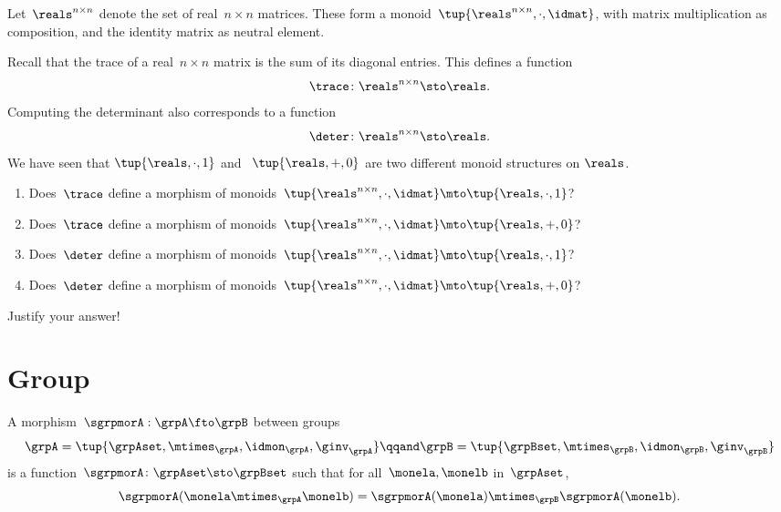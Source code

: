 \begin{gradedexercise}
  \label{ex:tr-and-det}
Let~$\reals^{n \times n}$ denote the set of real~$n \times n$ matrices. These form a monoid~$\tup{\reals^{n \times n}, \cdot, \idmat}$, with matrix multiplication as composition, and the identity matrix as neutral element.

Recall that the trace of a real~$n \times n$ matrix is the sum of its diagonal entries. This defines a function
\begin{equation}
\trace \colon \reals^{n \times n} \sto \reals.
\end{equation}
Computing the determinant also corresponds to a function
\begin{equation}
\deter \colon \reals^{n \times n} \sto \reals.
\end{equation}
We have seen that $\tup{ \reals, \cdot, 1}$ and ~$\tup{ \reals, +, 0}$ are two different monoid structures on $\reals$.
\begin{enumerate}
\item Does~$\trace$ define a morphism of monoids~$\tup{\reals^{n \times n}, \cdot, \idmat} \mto \tup{ \reals, \cdot, 1}$?
\item Does~$\trace$ define a morphism of monoids~$\tup{\reals^{n \times n}, \cdot, \idmat} \mto \tup{ \reals, + , 0}$?
\item Does~$\deter$ define a morphism of monoids~$\tup{\reals^{n \times n}, \cdot, \idmat} \mto \tup{ \reals, \cdot, 1}$?
\item Does~$\deter$ define a morphism of monoids~$\tup{\reals^{n \times n}, \cdot, \idmat} \mto \tup{ \reals, + , 0}$?
\end{enumerate}
Justify your answer!
\end{gradedexercise}


\section{Group \whomos}





\begin{ctdefinition}
  \label{def:group-mor}
  A morphism~$\sgrpmorA: \grpA \fto \grpB$ between groups
  \begin{equation}
    \grpA = \tup{\grpAset, \mtimes_\grpA, \idmon_\grpA, \ginv_\grpA}
    \qqand
    \grpB = \tup{\grpBset, \mtimes_\grpB, \idmon_\grpB,  \ginv_\grpB}
  \end{equation}
  is a function~$\sgrpmorA \colon \grpAset \sto \grpBset$ such that
  for all~$\monela, \monelb$ in~$\grpAset$,
  \begin{equation}
    \label{eq:group-mor-comp}
    \sgrpmorA (\monela \mtimes_{\grpA} \monelb) = \sgrpmorA (\monela) \mtimes_{\grpB}  \sgrpmorA(\monelb).
  \end{equation}
\end{ctdefinition}

